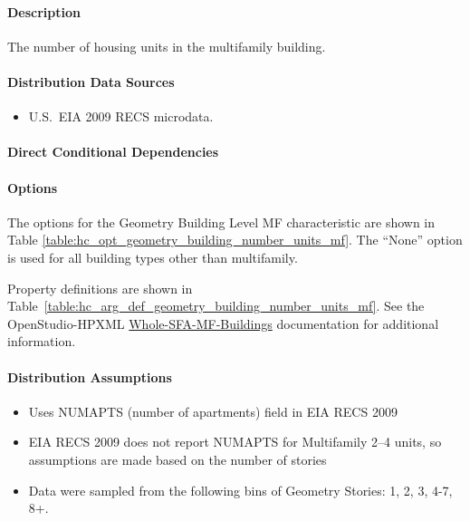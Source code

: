 \paragraph{Description}
% 
The number of housing units in the multifamily building.

\paragraph{Distribution Data Sources}
% 
\begin{itemize}
    \item U.S.~EIA 2009 RECS microdata.
\end{itemize}

\paragraph{Direct Conditional Dependencies}


\paragraph{Options}
The options for the Geometry Building Level MF characteristic are shown in Table \ref{table:hc_opt_geometry_building_number_units_mf}. The ``None'' option is used for all building types other than multifamily.



Property definitions are shown in Table~\ref{table:hc_arg_def_geometry_building_number_units_mf}. See the OpenStudio-HPXML \href{https://openstudio-hpxml.readthedocs.io/en/v1.10.0/workflow_inputs.html#whole-sfa-mf-buildings}{Whole-SFA-MF-Buildings} documentation for additional information.



\paragraph{Distribution Assumptions}
% 
\begin{itemize}
    \item Uses NUMAPTS (number of apartments) field in EIA RECS 2009
    \item EIA RECS 2009 does not report NUMAPTS for Multifamily 2--4 units, so assumptions are made based on the number of stories
    \item Data were sampled from the following bins of Geometry Stories: 1, 2, 3, 4-7, 8+.
\end{itemize}
